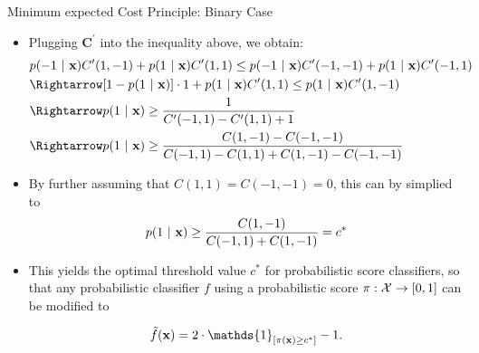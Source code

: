 \documentclass[11pt,compress,t,notes=noshow, xcolor=table]{beamer}
\begin{document}
\begin{vbframe}{Minimum expected Cost Principle: Binary Case}
{\begin{itemize}
			\item Plugging $\mathbf{C}^\prime$ into the inequality above, we obtain:	
			\begin{align*}	
                & p(-1 ~|~ \xv ) C^\prime(1,-1)  + 	p(1 ~|~ \xv ) C^\prime(1,1) \leq  p(-1 ~|~ \xv ) C^\prime(-1,-1)  + 	p(1 ~|~ \xv ) C^\prime(-1,1)  \\ 
                &\Rightarrow [1 - p(1 ~|~ \xv)] \cdot 1 + p(1 ~|~ \xv) C^\prime(1, 1) \leq p(1 ~|~ \xv) C^\prime(1, -1) \\
                &\Rightarrow p(1 ~|~ \xv) \geq \frac{1}{C^\prime(-1, 1) - C^\prime(1, 1) + 1} \\
                &\Rightarrow p(1 ~|~ \xv) \geq \frac{C(1, -1) - C(-1, -1)}{C(-1, 1) - C(1, 1) + C(1, -1) - C(-1, -1)}
			\end{align*}
		
            \item By further assuming that $C(1, 1) = C(-1, -1) = 0 $, this can by simplied to 
            \begin{align*}
                p(1 ~|~ \mathbf{x}) \geq \frac{C(1, -1)}{C(-1, 1) + C(1, -1)} = c^{*}
            \end{align*}	
            
            \item This yields the optimal threshold value $c^*$ for probabilistic score classifiers, so that any probabilistic classifier $f$ using a probabilistic score $\pi:\mathcal{X} \to [0,1]$ can be modified to 
            
            $$   \tilde f(\xv) = 2 \cdot \mathds{1}_{[ \pi(\xv) \geq c^*]} -1. $$
							
		\end{itemize}
	}
\end{vbframe}
\end{document}
